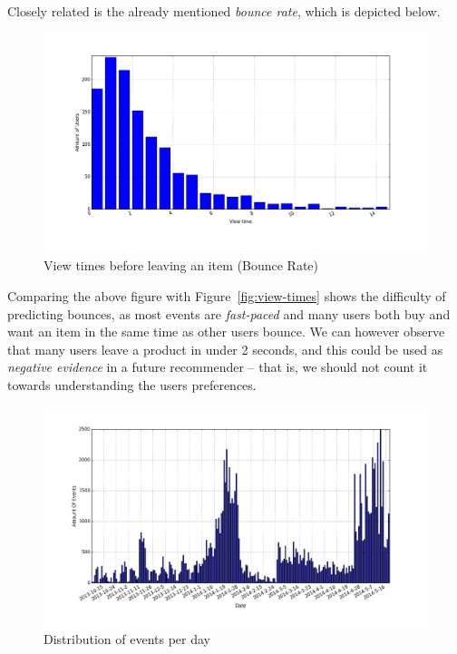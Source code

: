 Closely related is the already mentioned \textit{bounce rate}, which is
depicted below.

\begin{figure}[H]
  \centering
  \includegraphics[width=5in]{image/product_detail_clickeddistribution.png}
  \caption{View times before leaving an item (Bounce Rate)}
  \label{figure:bounceRate}
\end{figure}

Comparing the above figure with Figure~\ref{fig:view-times} shows the
difficulty of predicting bounces, as most events are \textit{fast-paced} and
many users both buy and want an item in the same time as other users bounce.
We can however observe that many users leave a product in under 2 seconds, and
this could be used as \textit{negative evidence} in a future recommender --
that is, we should not count it towards understanding the users preferences.

\begin{figure}[H]
  \centering
  \includegraphics[width=5in]{image/eventsPerDay.png}
  \caption{Distribution of events per day}
  \label{figure:eventOnDaysDist}
\end{figure}

